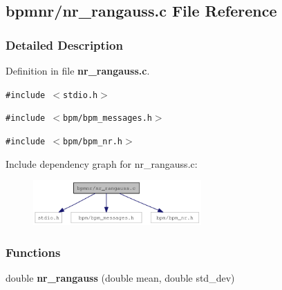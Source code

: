 \subsection{bpmnr/nr\_\-rangauss.c File Reference}
\label{nr__rangauss_8c}


\subsubsection{Detailed Description}


Definition in file {\bf nr\_\-rangauss.c}.

{\tt \#include $<$stdio.h$>$}\par
{\tt \#include $<$bpm/bpm\_\-messages.h$>$}\par
{\tt \#include $<$bpm/bpm\_\-nr.h$>$}\par


Include dependency graph for nr\_\-rangauss.c:\nopagebreak
\begin{figure}[H]
\begin{center}
\leavevmode
\includegraphics[width=182pt]{nr__rangauss_8c__incl}
\end{center}
\end{figure}
\subsubsection*{Functions}
\begin{CompactItemize}
\item 
double {\bf nr\_\-rangauss} (double mean, double std\_\-dev)
\end{CompactItemize}
